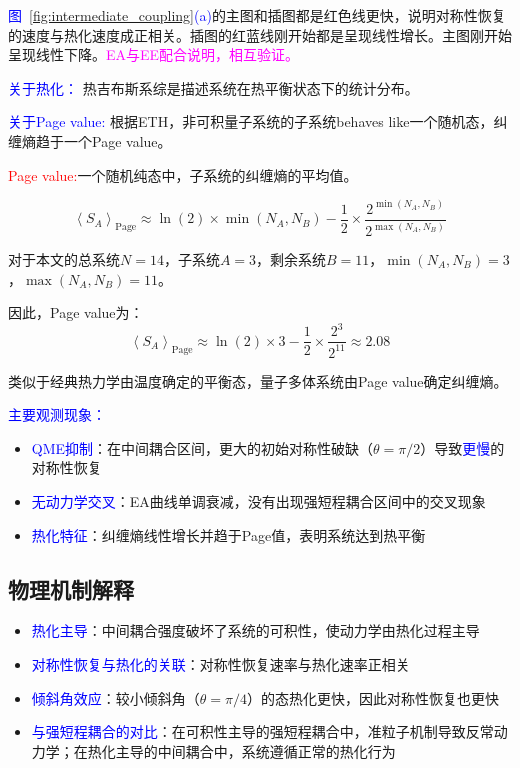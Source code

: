 \documentclass[11pt,a4paper]{article}
\begin{document}
\textcolor{blue}{图~\ref{fig:intermediate_coupling}(a)}的主图和插图都是红色线更快，说明对称性恢复的速度与热化速度成正相关。插图的红蓝线刚开始都是呈现线性增长。主图刚开始呈现线性下降。\textcolor{magenta}{EA与EE配合说明，相互验证。}


\textcolor{blue}{关于热化：}
热吉布斯系综是描述系统在热平衡状态下的统计分布。

\textcolor{blue}{关于Page value:}
根据ETH，非可积量子系统的子系统behaves like一个随机态，纠缠熵趋于一个Page value。

\textcolor{red}{Page value:}一个随机纯态中，子系统的纠缠熵的平均值。

\begin{equation}
\left\langle S_A\right\rangle_{\mathrm{Page}} \approx \ln (2) \times \min \left(N_A, N_B\right)-\frac{1}{2} \times \frac{2^{\min \left(N_A, N_B\right)}}{2^{\max \left(N_A, N_B\right)}}
\end{equation}

对于本文的总系统$N=14$，子系统$A=3$，剩余系统$B=11$，$\min \left(N_A, N_B\right) = 3$，$\max \left(N_A, N_B\right) = 11$。

因此，Page value为：
\begin{equation}
\left\langle S_A\right\rangle_{\mathrm{Page}} \approx \ln (2) \times 3-\frac{1}{2} \times \frac{2^{3}}{2^{11}} \approx 2.08
\end{equation}

类似于经典热力学由温度确定的平衡态，量子多体系统由Page value确定纠缠熵。


\textcolor{blue}{主要观测现象：}
\begin{itemize}
    \item \textcolor{blue}{QME抑制}：在中间耦合区间，更大的初始对称性破缺（$\theta = \pi/2$）导致\textcolor{blue}{更慢}的对称性恢复
    \item \textcolor{blue}{无动力学交叉}：EA曲线单调衰减，没有出现强短程耦合区间中的交叉现象
    \item \textcolor{blue}{热化特征}：纠缠熵线性增长并趋于Page值，表明系统达到热平衡
\end{itemize}

\subsection{物理机制解释}
\begin{itemize}
    \item \textcolor{blue}{热化主导}：中间耦合强度破坏了系统的可积性，使动力学由热化过程主导
    \item \textcolor{blue}{对称性恢复与热化的关联}：对称性恢复速率与热化速率正相关
    \item \textcolor{blue}{倾斜角效应}：较小倾斜角（$\theta = \pi/4$）的态热化更快，因此对称性恢复也更快
    \item \textcolor{blue}{与强短程耦合的对比}：在可积性主导的强短程耦合中，准粒子机制导致反常动力学；在热化主导的中间耦合中，系统遵循正常的热化行为
\end{itemize}
\end{document}

